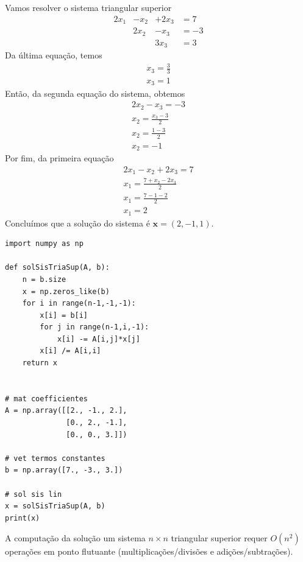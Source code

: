 \begin{ex}
  Vamos resolver o sistema triangular superior
  \begin{equation}
    \begin{matrix}
      2x_1 &- x_2 &+ 2x_3 &= 7\\
      & 2x_2 &- x_3 &= -3\\
      &&3x_3 &= 3
    \end{matrix}
  \end{equation}
  Da última equação, temos
  \begin{gather}
    x_3 = \frac{3}{3}\\
    x_3 = 1
  \end{gather}
  Então, da segunda equação do sistema, obtemos
  \begin{gather}
    2x_2 - x_3 = -3\\
    x_2 = \frac{x_3 - 3}{2}\\
    x_2 = \frac{1 - 3}{2}\\
    x_2 = -1
  \end{gather}
  Por fim, da primeira equação
  \begin{gather}
    2x_1 - x_2 + 2x_3 = 7\\
    x_1 = \frac{7 + x_2 - 2x_3}{2}\\
    x_1 = \frac{7 - 1 - 2}{2}\\
    x_1 = 2
  \end{gather}
  Concluímos que a solução do sistema é $\pmb{x} = (2, -1, 1)$.

\begin{lstlisting}[caption=solSisTriaSup.py, label=cap_sislin_sec_lu:cod:solSisTriaSup]
import numpy as np

def solSisTriaSup(A, b):
    n = b.size
    x = np.zeros_like(b)
    for i in range(n-1,-1,-1):
        x[i] = b[i]
        for j in range(n-1,i,-1):
            x[i] -= A[i,j]*x[j]
        x[i] /= A[i,i]
    return x
    

# mat coefficientes
A = np.array([[2., -1., 2.],
              [0., 2., -1.],
              [0., 0., 3.]])

# vet termos constantes
b = np.array([7., -3., 3.])

# sol sis lin
x = solSisTriaSup(A, b)
print(x)
\end{lstlisting}
\end{ex}

\begin{obs}
  A computação da solução um sistema $n\times n$ triangular superior requer $O(n^2)$ operações em ponto flutuante (multiplicações/divisões e adições/subtrações).
\end{obs}

